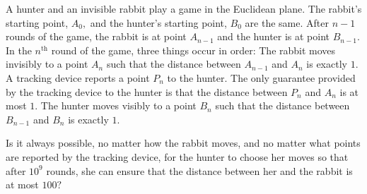 A hunter and an invisible rabbit play a game in the Euclidean plane. The rabbit's starting point, 
$A_0,$
 and the hunter's starting point, 
$B_0$
 are the same. After 
$n-1$
 rounds of the game, the rabbit is at point 
$A_{n-1}$
 and the hunter is at point 
$B_{n-1}.$
 In the 
$n^{\text{th}}$
 round of the game, three things occur in order:
The rabbit moves invisibly to a point 
$A_n$
 such that the distance between 
$A_{n-1}$
 and 
$A_n$
 is exactly 
$1.$
A tracking device reports a point 
$P_n$
 to the hunter. The only guarantee provided by the tracking device to the hunter is that the distance between 
$P_n$
 and 
$A_n$
 is at most 
$1.$
The hunter moves visibly to a point 
$B_n$
 such that the distance between 
$B_{n-1}$
 and 
$B_n$
 is exactly 
$1.$


Is it always possible, no matter how the rabbit moves, and no matter what points are reported by the tracking device, for the hunter to choose her moves so that after 
$10^9$
 rounds, she can ensure that the distance between her and the rabbit is at most 
$100?$
